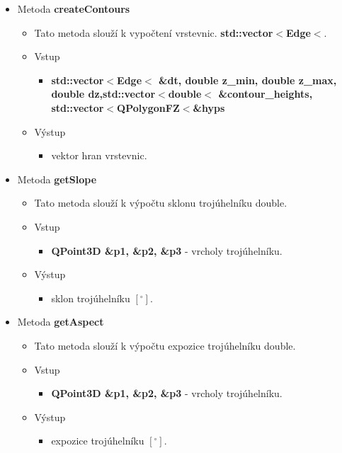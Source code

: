 \documentclass[a4paper, 12pt]{article}
\begin{document}
\begin{itemize}
	\item Metoda \textbf{createContours}		
\begin{itemize}
	\item Tato metoda slouží k vypočtení vrstevnic. \textbf{std::vector$<$Edge$<$}.
	\item Vstup
	\begin{itemize}
		\item \textbf{std::vector$<$Edge$<$ \&dt,
			double z\_min, double z\_max,
			double dz,std::vector$<$double$<$ \&contour\_heights, std::vector$<$QPolygonFZ$<$\&hyps} 
	\end{itemize}
	\item Výstup
	\begin{itemize}	
		\item vektor hran vrstevnic.
	\end{itemize}
\end{itemize}

	\item Metoda \textbf{getSlope}		
\begin{itemize}
	\item Tato metoda slouží k výpočtu sklonu trojúhelníku {double}.
	\item Vstup
	\begin{itemize}
		\item \textbf{QPoint3D \&p1, \&p2, \&p3} - vrcholy trojúhelníku.
	\end{itemize}
	\item Výstup
	\begin{itemize}	
		\item sklon trojúhelníku $[^\circ]$.
	\end{itemize}
\end{itemize}

	\item Metoda \textbf{getAspect}		
\begin{itemize}
	\item Tato metoda slouží k výpočtu expozice trojúhelníku {double}.
	\item Vstup
	\begin{itemize}
		\item \textbf{QPoint3D \&p1, \&p2, \&p3} - vrcholy trojúhelníku.
	\end{itemize}
	\item Výstup
	\begin{itemize}	
		\item expozice trojúhelníku $[^\circ]$.
	\end{itemize}
\end{itemize}


\end{itemize}
\end{document}
